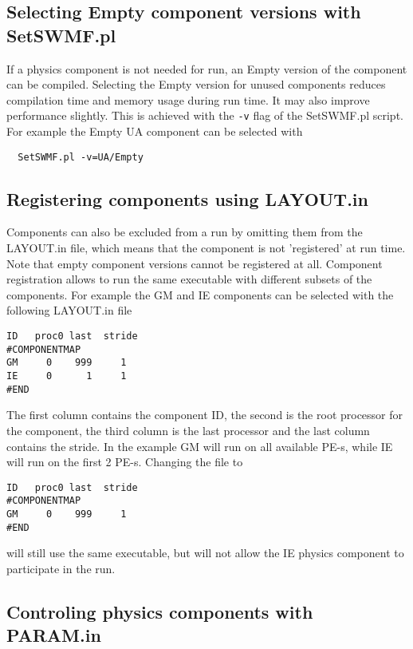 \subsection{Selecting Empty component versions with SetSWMF.pl}

If a physics component is not needed for run, an Empty version of the
component can be compiled.
Selecting the Empty version for unused components reduces
compilation time and memory usage during run time.
It may also improve performance slightly.
This is achieved with the {\tt -v} flag of the SetSWMF.pl script. 
For example the Empty UA component can be selected with
\begin{verbatim}
  SetSWMF.pl -v=UA/Empty
\end{verbatim}

\subsection{Registering components using LAYOUT.in}

Components can also be excluded from a run by omitting them from the LAYOUT.in 
file, which means that the component is not 'registered' at run time.
Note that empty component versions cannot be registered at all.
Component registration allows to run the same executable with different 
subsets of the components. For example the GM and IE components 
can be selected with the following LAYOUT.in file
\begin{verbatim}
ID   proc0 last  stride
#COMPONENTMAP
GM     0    999     1
IE     0      1     1
#END
\end{verbatim}
The first column contains the component ID, the second is the
root processor for the component, the third column is the
last processor and the last column contains the stride.
In the example GM will run on all available PE-s, while IE
will run on the first 2 PE-s.  Changing the file to
\begin{verbatim}
ID   proc0 last  stride
#COMPONENTMAP
GM     0    999     1
#END
\end{verbatim}
will still use the same executable, but will not allow the IE 
physics component to participate in the run.

\subsection{Controling physics components with PARAM.in}

